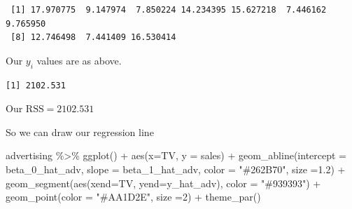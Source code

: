 \documentclass[
  letterpaper,
  DIV=11,
  numbers=noendperiod]{scrreprt}
\newenvironment{Shaded}{\begin{snugshade}}{\end{snugshade}}
\newcommand{\AttributeTok}[1]{\textcolor[rgb]{0.40,0.45,0.13}{#1}}
\newcommand{\DecValTok}[1]{\textcolor[rgb]{0.68,0.00,0.00}{#1}}
\newcommand{\FloatTok}[1]{\textcolor[rgb]{0.68,0.00,0.00}{#1}}
\newcommand{\FunctionTok}[1]{\textcolor[rgb]{0.28,0.35,0.67}{#1}}
\newcommand{\NormalTok}[1]{\textcolor[rgb]{0.00,0.23,0.31}{#1}}
\newcommand{\OtherTok}[1]{\textcolor[rgb]{0.00,0.23,0.31}{#1}}
\newcommand{\SpecialCharTok}[1]{\textcolor[rgb]{0.37,0.37,0.37}{#1}}
\newcommand{\StringTok}[1]{\textcolor[rgb]{0.13,0.47,0.30}{#1}}
\begin{document}
\begin{verbatim}
 [1] 17.970775  9.147974  7.850224 14.234395 15.627218  7.446162  9.765950
 [8] 12.746498  7.441409 16.530414
\end{verbatim}

Our \(y_i\) values are as above.

\begin{Shaded}
\end{Shaded}

\begin{verbatim}
[1] 2102.531
\end{verbatim}

Our \(\text{RSS} = 2102.531\)

So we can draw our regression line

\begin{Shaded}
\begin{Highlighting}[]
\NormalTok{advertising }\SpecialCharTok{\%\textgreater{}\%}
  \FunctionTok{ggplot}\NormalTok{() }\SpecialCharTok{+} \FunctionTok{aes}\NormalTok{(}\AttributeTok{x=}\NormalTok{TV, }\AttributeTok{y =}\NormalTok{ sales) }\SpecialCharTok{+}  \FunctionTok{geom\_abline}\NormalTok{(}\AttributeTok{intercept =}\NormalTok{ beta\_0\_hat\_adv, }\AttributeTok{slope =}\NormalTok{ beta\_1\_hat\_adv, }\AttributeTok{color =} \StringTok{"\#262B70"}\NormalTok{, }\AttributeTok{size =}\FloatTok{1.2}\NormalTok{) }\SpecialCharTok{+}
  \FunctionTok{geom\_segment}\NormalTok{(}\FunctionTok{aes}\NormalTok{(}\AttributeTok{xend=}\NormalTok{TV, }\AttributeTok{yend=}\NormalTok{y\_hat\_adv), }\AttributeTok{color =} \StringTok{"\#939393"}\NormalTok{) }\SpecialCharTok{+}
  \FunctionTok{geom\_point}\NormalTok{(}\AttributeTok{color =} \StringTok{"\#AA1D2E"}\NormalTok{, }\AttributeTok{size =}\DecValTok{2}\NormalTok{) }\SpecialCharTok{+} \FunctionTok{theme\_par}\NormalTok{()}
\end{Highlighting}
\end{Shaded}
\end{document}
